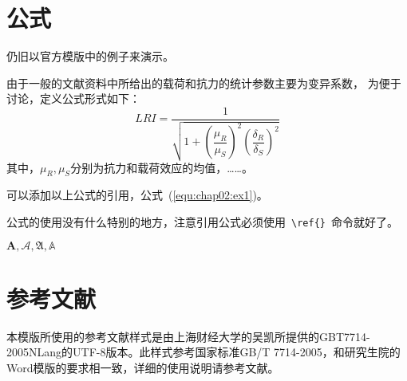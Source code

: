     \section{公式}
    仍旧以官方模版中的例子来演示。

    由于一般的文献资料中所给出的载荷和抗力的统计参数主要为变异系数，
    为便于讨论，定义公式形式如下：
    \begin{equation}
    \label{equ:chap02:ex1}
        LRI = \dfrac{1}{\sqrt{1+{\left(\dfrac{\mu_R}{\mu_S}\right)}^2{\left(\dfrac{\delta_R}{\delta_S}\right)}^2}}
    \end{equation}
    其中，$\mu_R,\mu_S$分别为抗力和载荷效应的均值，……。

    可以添加以上公式的引用，公式~(\ref{equ:chap02:ex1})。

    公式的使用没有什么特别的地方，注意引用公式必须使用~\Verb+\ref{}+~命令就好了。
    
    $\mathbf{A},\mathcal{A},\mathfrak{A},\mathbb{A}$

    \section{参考文献}

    本模版所使用的参考文献样式是由上海财经大学的吴凯所提供的GBT7714-2005NLang的UTF-8版本。此样式参考国家标准GB/T 7714-2005，和研究生院的Word模版的要求相一致，详细的使用说明请参考文献\cite{GBT7714-2005}。 